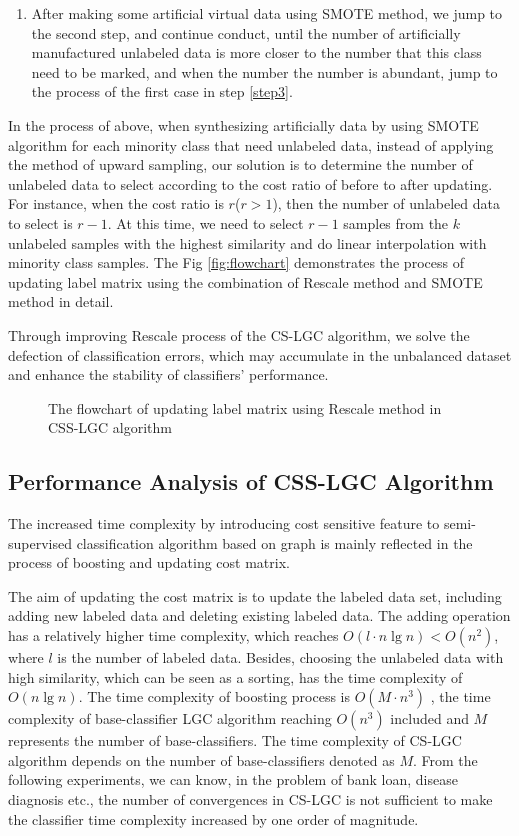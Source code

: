\documentclass{svjour3}                     %
\begin{document}
\begin{enumerate}[1)]
\item After making some artificial virtual data using SMOTE method, we jump to the second step, and continue conduct, until the number of artificially manufactured unlabeled data is more closer to
the number that this class need to be marked, and when the number the number is abundant, jump to the process of the first case in step \ref{step3}.

\end{enumerate}

In the process of above, when synthesizing artificially data by using SMOTE algorithm for each minority class that need unlabeled data, instead of applying the method of upward sampling, our solution is to determine the number of unlabeled data to select according to the cost ratio of before  to after updating. For instance, when the cost ratio is $r$($r>1$), then the number of unlabeled data to select is $r-1$. At this time, we need to select $r-1$ samples from the $k$ unlabeled samples with the highest similarity and do linear interpolation with minority class samples. The Fig \ref{fig:flowchart} demonstrates the process of updating label matrix using the combination of Rescale method and SMOTE method in detail.

Through improving Rescale process of the CS-LGC algorithm, we solve the defection of classification errors, which may accumulate in the unbalanced dataset and enhance the stability of classifiers' performance.
\begin{figure}[ht]

\caption{The flowchart of updating label matrix using Rescale method in CSS-LGC algorithm}
\end{figure}
\label{fig:flowchart}
\subsection{Performance Analysis of CSS-LGC Algorithm}
The increased time complexity by introducing cost sensitive feature to semi-supervised classification algorithm based on graph is mainly reflected in the process of boosting and updating cost matrix.

The aim of updating the cost matrix is to update the labeled data set, including adding new labeled data and deleting existing labeled data. The adding operation has a relatively higher time complexity, which reaches $O(l \cdot n\lg n) < O({n^2}) $, where $l$ is the number of labeled data. Besides, choosing the unlabeled data with high similarity, which can be seen as a sorting, has the time complexity of $O(n\lg n)$. The time complexity of boosting process is $O(M \cdot {n^3})$ ,  the time complexity of base-classifier LGC algorithm reaching $O({n^3})$ included and $M$ represents the number of base-classifiers. The time complexity of CS-LGC algorithm depends on the number of base-classifiers denoted as $M$. From the following experiments, we can know, in the problem of bank loan, disease diagnosis etc., the number of convergences in CS-LGC is not sufficient to make the classifier time complexity increased by one order of magnitude.
\end{document}
